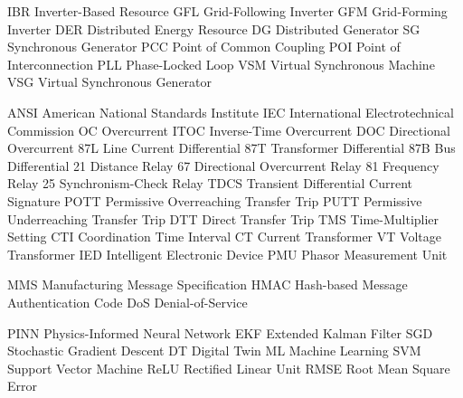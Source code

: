 
  {IBR}  {Inverter-Based Resource}
  {GFL}  {Grid-Following Inverter}
  {GFM}  {Grid-Forming Inverter}
  {DER}  {Distributed Energy Resource}
   {DG}   {Distributed Generator}
   {SG}   {Synchronous Generator}
  {PCC}  {Point of Common Coupling}
  {POI}  {Point of Interconnection}
  {PLL}  {Phase-Locked Loop}
  {VSM}  {Virtual Synchronous Machine}
  {VSG}  {Virtual Synchronous Generator}

 {ANSI} {American National Standards Institute}
  {IEC}  {International Electrotechnical Commission}
   {OC}   {Overcurrent}
 {ITOC} {Inverse-Time Overcurrent}
  {DOC}  {Directional Overcurrent}
  {87L}  {Line Current Differential}
  {87T}  {Transformer Differential}
  {87B}  {Bus Differential}
   {21}   {Distance Relay}
   {67}   {Directional Overcurrent Relay}
   {81}   {Frequency Relay}
   {25}   {Synchronism-Check Relay}
 {TDCS} {Transient Differential Current Signature}
 {POTT} {Permissive Overreaching Transfer Trip}
 {PUTT} {Permissive Underreaching Transfer Trip}
  {DTT}  {Direct Transfer Trip}
  {TMS}  {Time-Multiplier Setting}
  {CTI}  {Coordination Time Interval}
   {CT}   {Current Transformer}
   {VT}   {Voltage Transformer}
  {IED}  {Intelligent Electronic Device}
  {PMU}  {Phasor Measurement Unit}

  {MMS}  {Manufacturing Message Specification}
 {HMAC} {Hash-based Message Authentication Code}
  {DoS}  {Denial-of-Service}

 {PINN} {Physics-Informed Neural Network}
  {EKF}  {Extended Kalman Filter}
  {SGD}  {Stochastic Gradient Descent}
   {DT}   {Digital Twin}
   {ML}   {Machine Learning}
  {SVM}  {Support Vector Machine}
 {ReLU} {Rectified Linear Unit}
 {RMSE} {Root Mean Square Error}

